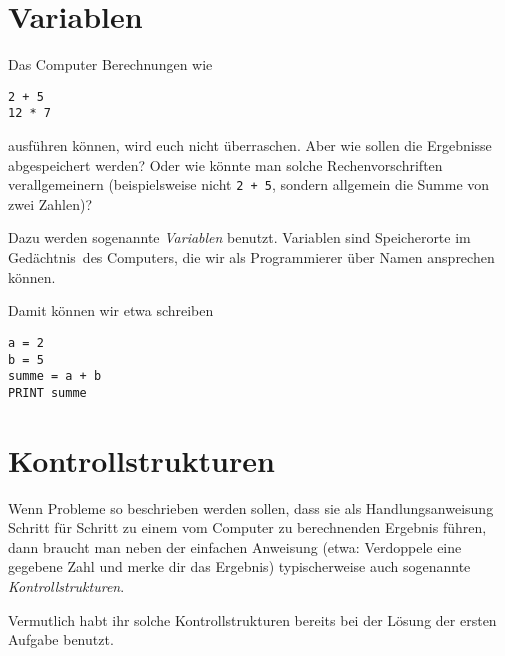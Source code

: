 \clearpage

\rehead[]{\textcolor{lightblue}{AvHG, Inf, My}}
\lohead[]{\textcolor{lightblue}{AvHG, Inf, My}}

\lstset{style=myJava}


\section{Variablen}

Das Computer Berechnungen wie

\begin{lstlisting}
2 + 5
12 * 7
\end{lstlisting}

ausführen können, wird euch nicht überraschen. Aber wie sollen die Ergebnisse
abgespeichert werden? Oder wie könnte man solche Rechenvorschriften
verallgemeinern (beispielsweise nicht \lstinline|2 + 5|, sondern allgemein die
Summe von zwei Zahlen)?

Dazu werden sogenannte \emph{Variablen} benutzt. Variablen sind Speicherorte im
\glqq Gedächtnis\grqq\ des Computers, die wir als Programmierer über Namen
ansprechen können.

Damit können wir etwa schreiben

\begin{lstlisting}
a = 2
b = 5
summe = a + b
PRINT summe
\end{lstlisting}


\section{Kontrollstrukturen}

Wenn Probleme so beschrieben werden sollen, dass sie als Handlungsanweisung
Schritt für Schritt zu einem vom Computer zu berechnenden Ergebnis führen, dann
braucht man neben der einfachen Anweisung (etwa: Verdoppele eine gegebene Zahl
und merke dir das Ergebnis) typischerweise auch sogenannte
\emph{Kontrollstrukturen}.

Vermutlich habt ihr solche Kontrollstrukturen bereits bei der Lösung der ersten
Aufgabe benutzt.

